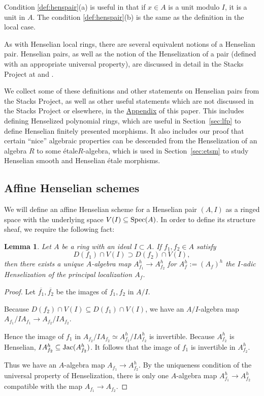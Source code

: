 \documentclass[12pt]{article}
\newcommand{\spec}{{\rm Spec}}
\newcommand{\Jac}{{\rm Jac}}
\newcommand{\ol}[1]{\overline{#1}}
\newcommand{\Et}{\'etale\xspace}
\newcommand{\spcite}[2]{\cite[\href{https://stacks.math.columbia.edu/tag/#1}{{#2} {#1}}]{stackp}}
\newtheorem{lemma}[theorem]{Lemma}
\theoremstyle{definition}
\numberwithin{equation}{subsection}
\begin{document}
Condition \ref{def:henspair}(a) is useful in that if $x \in A$ is a unit modulo $I$, it is a unit in $A$. The condition \ref{def:henspair}(b) is the same as the definition in the local case. 

As with Henselian local rings, there are several equivalent notions of a Henselian pair. Henselian pairs, as well as the notion of the Henselization of a pair (defined with an appropriate universal property), are discussed in detail in the Stacks Project at \spcite{09XD}{Section} and \spcite{0EM7}{Section}. 

We collect some of these definitions and other statements on Henselian pairs from the Stacks Project, as well as other useful statements which are not discussed in the Stacks Project or elsewhere, in the \hyperref[sec:appendix]{Appendix} of this paper. This includes defining Henselized polynomial rings, which are useful in Section~\ref{sec:lfp} to define Henselian finitely presented morphisms. It also includes our proof that certain ``nice'' algebraic properties can be descended from the Henselization of an algebra $R$ to some \Et $R$-algebra, which is used in Section~\ref{sec:etsm} to study Henselian smooth and Henselian \Et morphisms.


\subsection{Affine Henselian schemes}


 We will define an affine Henselian scheme for a Henselian pair $(A,I)$ as a ringed space with the underlying space $V(I) \subseteq \spec(A)$. In order to define its structure sheaf, we require the following fact:

\begin{lemma}\label{lem:defshf} Let $A$ be a ring with an ideal $I \subset A$. If $f_1,f_2 \in A$ satisfy $$D(f_1) \cap V(I) \supset D(f_2) \cap V(I),$$ then there exists a unique $A$-algebra map $A_{f_1}^h \to A_{f_2}^h$ for $A_f^h := (A_f)^h$ the $I$-adic Henselization of the principal localization $A_f$.
\end{lemma}
\begin{proof} Let $\ol{f_1},\ol{f_2}$ be the images of $f_1,f_2$ in $A/I$. 


Because $D(f_2) \cap V(I) \subseteq D(f_1) \cap V(I)$, we have an $A/I$-algebra map $A_{f_1}/IA_{f_1} \to A_{f_2}/IA_{f_2}$.

Hence the image of $f_1$ in $A_{f_2}/IA_{f_2} \simeq A_{f_2}^h/IA_{f_2}^h$ is invertible. Because $A_{f_2}^h$ is Henselian, $IA_{f_2}^h\subseteq\Jac(A_{f_2}^h)$. It follows that the image of $f_1$ is invertible in $A_{f_2}^h$. 

Thus we have an $A$-algebra map $A_{f_1} \to A_{f_2}^h$. By the uniqueness condition of the universal property of Henselization, there is only one $A$-algebra map $A_{f_1}^h \to A_{f_2}^h$ compatible with the map $A_{f_1} \to A_{f_2}$. \end{proof}
\end{document}
